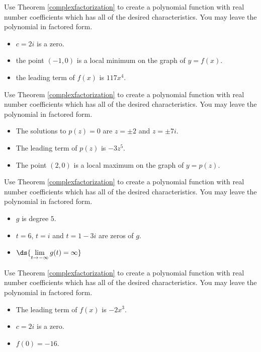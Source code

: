 \documentclass{ximera}
\begin{document}
\begin{problem}
Use Theorem \ref{complexfactorization} to create a polynomial function with real number coefficients which has all of the desired characteristics.  You may leave the polynomial in factored form.

\begin{itemize}

\item $c=2i$ is a zero.
\item the point $(-1,0)$ is a local minimum on the graph of $y=f(x)$.
\item the leading term of $f(x)$ is $117x^4$.

\end{itemize}
\end{problem}

\begin{problem}
Use Theorem \ref{complexfactorization} to create a polynomial function with real number coefficients which has all of the desired characteristics.  You may leave the polynomial in factored form.

\begin{itemize}

\item The solutions to $p(z) = 0$ are $z = \pm 2$ and $z=\pm 7i$.
\item The leading term of $p(z)$ is $-3z^5$.
\item The point $(2,0)$ is a local maximum on the graph of $y=p(z)$.

\end{itemize}
\end{problem}

\begin{problem}
Use Theorem \ref{complexfactorization} to create a polynomial function with real number coefficients which has all of the desired characteristics.  You may leave the polynomial in factored form.

\begin{itemize}

\item $g$ is degree $5$.
\item $t=6$, $t = i$ and $t = 1-3i$ are zeros of $g$.
\item $\ds{\lim_{t \rightarrow -\infty} g(t) = \infty}$ 

\end{itemize}
\end{problem}

\begin{problem}
Use Theorem \ref{complexfactorization} to create a polynomial function with real number coefficients which has all of the desired characteristics.  You may leave the polynomial in factored form.

\begin{itemize}

\item The leading term of $f(x)$ is $-2x^3$.
\item $c=2i$ is a zero.
\item $f(0) = -16$.

\end{itemize}
\end{problem}
\end{document}

